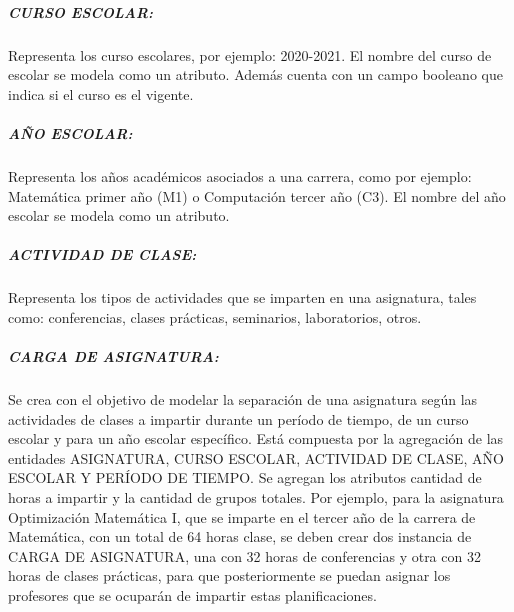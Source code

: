 \subparagraph{CURSO ESCOLAR:}
Representa los curso escolares, por ejemplo: 2020-2021.
El nombre del curso de escolar se modela como un atributo. Además 
cuenta con un campo booleano que indica si el curso es el vigente.

\subparagraph{AÑO ESCOLAR:}
Representa los años académicos asociados a una carrera, como por ejemplo:
Matemática primer año (M1) o Computación tercer año (C3).
El nombre del año escolar se modela como un atributo.

\subparagraph{ACTIVIDAD DE CLASE:}
Representa los tipos de actividades que se imparten en una asignatura, 
tales como: conferencias, clases prácticas, seminarios, laboratorios, otros. 


\subparagraph{CARGA DE ASIGNATURA:}
Se crea con el objetivo de modelar la separación de una asignatura
según las actividades de clases a impartir durante un período de tiempo, de un curso escolar y para
un año escolar específico. Está compuesta por la agregación de las entidades ASIGNATURA, CURSO ESCOLAR, ACTIVIDAD DE CLASE, AÑO  
ESCOLAR Y PERÍODO DE TIEMPO.
Se agregan los atributos cantidad de horas a impartir y 
la cantidad de grupos totales.
Por ejemplo, para la asignatura Optimización Matemática I, que se imparte 
en el tercer año de la carrera de Matemática, con un total de 64 horas clase, 
se deben crear dos instancia de CARGA DE ASIGNATURA, una con 32 horas 
de conferencias y otra con 32 horas de clases prácticas, para que posteriormente
se puedan asignar los profesores que se ocuparán de impartir estas planificaciones. 






